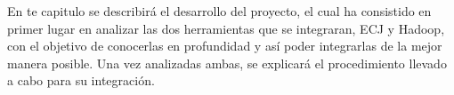 En te capitulo se describir\'a el desarrollo del proyecto, el cual ha consistido en primer lugar en analizar las dos herramientas que se integraran, ECJ y Hadoop, con el objetivo de conocerlas en profundidad y as\'i poder integrarlas de la mejor manera posible. Una vez analizadas ambas, se explicar\'a el procedimiento llevado a cabo para su integración.